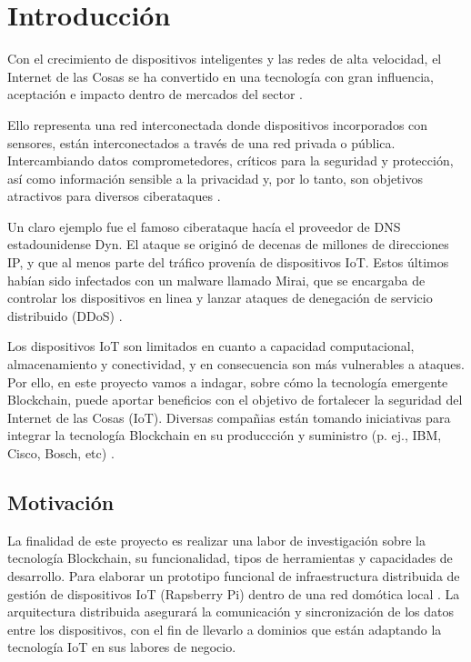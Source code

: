 \section{Introducción}

Con el crecimiento de dispositivos inteligentes y las redes de alta velocidad, el Internet de las Cosas se ha convertido
en una tecnología con gran influencia, aceptación e impacto dentro de mercados del sector \cite{khan2018iot}. 

\vspace{5mm}

\noindent Ello representa una red interconectada donde dispositivos incorporados con sensores, están interconectados a 
través de una red privada o pública. Intercambiando datos comprometedores, críticos para la seguridad y protección, así 
como información sensible a la privacidad y, por lo tanto, son objetivos atractivos para diversos ciberataques 
\cite{dorri2017blockchain}. 

\vspace{5mm}

\noindent Un claro ejemplo fue el famoso ciberataque hacía el proveedor de DNS estadounidense Dyn. El ataque se originó 
de decenas de millones de direcciones IP, y que al menos parte del tráfico provenía de dispositivos IoT. Estos últimos 
habían sido infectados con un malware llamado Mirai, que se encargaba de controlar los dispositivos en linea y lanzar 
ataques de denegación de servicio distribuido (DDoS) \cite{kshetri2017can}. 

\vspace{5mm}

\noindent Los dispositivos IoT son limitados en cuanto a capacidad computacional, almacenamiento y conectividad, y en 
consecuencia son más vulnerables a ataques. Por ello, en este proyecto vamos a indagar, sobre cómo la tecnología 
emergente Blockchain, puede aportar beneficios con el objetivo de fortalecer la seguridad del Internet de las Cosas 
(IoT). Diversas compañias están tomando iniciativas para integrar la tecnología Blockchain en su produccción y 
suministro (p. ej., IBM, Cisco, Bosch, etc) \cite{kshetri2017can}.   

\subsection{Motivación} \label{motivacion}

La finalidad de este proyecto es realizar una labor de investigación sobre la tecnología Blockchain, su funcionalidad, 
tipos de herramientas y capacidades de desarrollo. Para elaborar un prototipo funcional de infraestructura distribuida 
de gestión de dispositivos IoT (Rapsberry Pi) dentro de una red domótica local \cite{huh2017managing}. La arquitectura 
distribuida asegurará la comunicación y sincronización de los datos entre los dispositivos, con el fin de llevarlo a 
dominios que están adaptando la tecnología IoT en sus labores de negocio.


